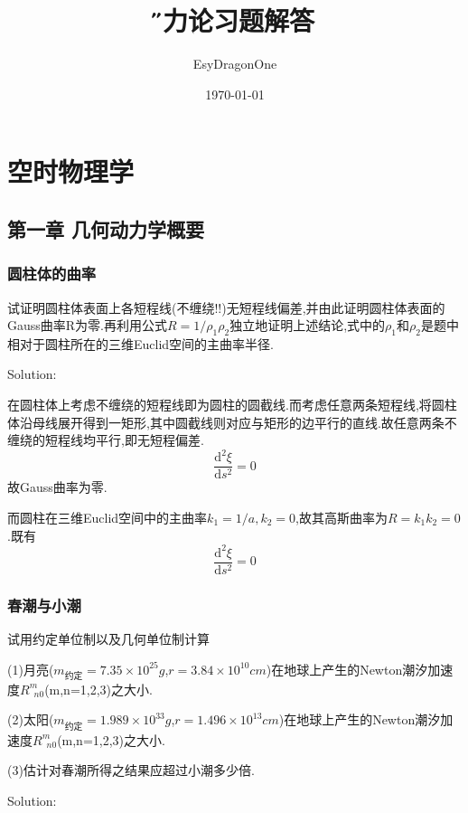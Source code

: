 \documentclass[12pt]{report}
\title{\H 引力论习题解答}
\author{EsyDragonOne}
\date{\E\today}
\newcommand{\ud}{\mathrm{d}} %
\begin{document}
\maketitle
\tableofcontents

\chapter{空时物理学}
\section{第一章 几何动力学概要}
\subsection{圆柱体的曲率}
试证明圆柱体表面上各短程线(不缠绕!!)无短程线偏差,并由此证明圆柱体表面的Gauss曲率R为零.再利用公式$R=1/\rho_{1}\rho_{2}$独立地证明上述结论,式中的$\rho_{1}$和$\rho_{2}$是题中相对于圆柱所在的三维Euclid空间的主曲率半径.

{\E Solution:}

在圆柱体上考虑不缠绕的短程线即为圆柱的圆截线.而考虑任意两条短程线,将圆柱体沿母线展开得到一矩形,其中圆截线则对应与矩形的边平行的直线.故任意两条不缠绕的短程线均平行,即无短程偏差.
\begin{displaymath}
\frac{\ud^{2} \xi}{\ud s^{2}}=0
\end{displaymath}
故Gauss曲率为零.

而圆柱在三维Euclid空间中的主曲率$k_{1}=1/a,k_{2}=0$,故其高斯曲率为$R=k_{1}k_{2}=0$.既有
\begin{displaymath}
\frac{\ud^{2} \xi}{\ud s^{2}}=0
\end{displaymath}

\newpage
\subsection{春潮与小潮}
试用约定单位制以及几何单位制计算

(1)月亮($m_{约定}=7.35\times 10^{25}g$,\quad$r=3.84\times 10^{10}cm$)在地球上产生的Newton潮汐加速度$R^{m}_{\phantom 0n0}$(m,n=1,2,3)之大小.

(2)太阳($m_{约定}=1.989\times 10^{33}g$,\quad$r=1.496\times 10^{13}cm$)在地球上产生的Newton潮汐加速度$R^{m}_{\phantom 0n0}$(m,n=1,2,3)之大小.

(3)估计对春潮所得之结果应超过小潮多少倍.

{\E Solution:}
\end{document}
